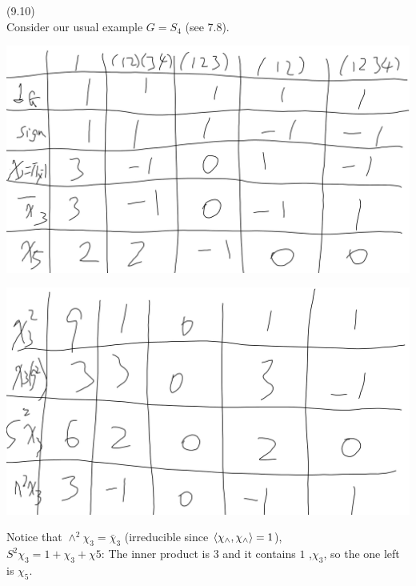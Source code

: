 \documentclass[a4paper]{article}
\begin{document}
\begin{eg} (9.10)\\
Consider our usual example $G=S_4$ (see 7.8).

\includegraphics[scale=0.5]{image/Rep_06.png}

\includegraphics[scale=0.5]{image/Rep_07.png}

Notice that $\wedge^2 \chi_3 = \bar{\chi}_3$ (irreducible since $\langle \chi_\wedge,\chi_\wedge\rangle = 1$),\\
$S^2 \chi_3 = 1+\chi_3+\chi5$: The inner product is 3 and it contains $1$ ,$\chi_3$, so the one left is $\chi_5$.
\end{eg}
\end{document}
